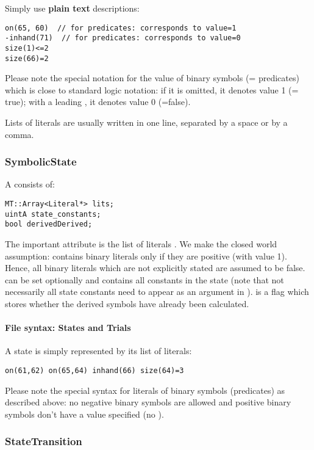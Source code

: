 \documentclass[10pt,twoside,twocolumn,fleqn]{article}
\begin{document}
Simply use \textbf{plain text} descriptions:
\begin{lstlisting}
on(65, 60)  // for predicates: corresponds to value=1
-inhand(71)  // for predicates: corresponds to value=0
size(1)<=2
size(66)=2
\end{lstlisting}
Please note the special notation for the value of binary symbols (=
predicates) which is close to standard logic notation: if it is omitted, it
denotes value 1 (= true); with a leading \code{-}, it denotes value 0
(=false).

Lists of literals are usually written in one line, separated by a space
or by a comma.





\subsubsection{SymbolicState}

A  consists of:
\begin{lstlisting}
MT::Array<Literal*> lits;
uintA state_constants;
bool derivedDerived;
\end{lstlisting}
The important attribute is the list of literals . We make the 
closed world assumption:  contains binary literals only if
they are positive (with value 1). Hence, all binary literals which are not
explicitly stated are assumed to be false.  can be
set optionally and contains all constants in the state (note that not
necessarily all state constants need to appear as an argument in
).  is a flag which stores whether the
derived symbols have already been calculated.



\paragraph{File syntax: States and Trials}

A state is simply represented by its list of literals:
\begin{lstlisting}
on(61,62) on(65,64) inhand(66) size(64)=3
\end{lstlisting}
Please note the special syntax for literals of binary symbols
(predicates) as described above: no negative binary symbols are allowed
and positive binary symbols don't have a value specified (no ).



\subsubsection{StateTransition}
\label{sec:state-transition}
\end{document}
